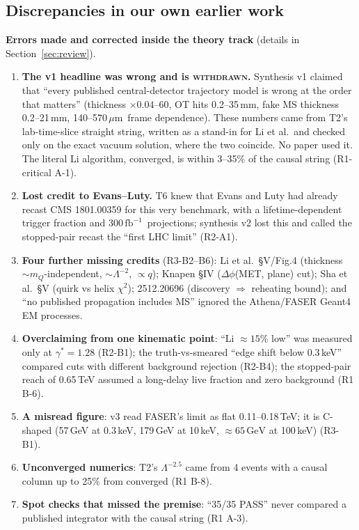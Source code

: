 \documentclass[11pt,a4paper]{article}
\newcommand{\WD}{\textcolor{bad}{\textsc{withdrawn}}}
\newcommand{\mQ}{m_Q}
\newcommand{\GeV}{\ensuremath{\,\mathrm{GeV}}}
\newcommand{\fbinv}{\ensuremath{\,\mathrm{fb}^{-1}}}
\newcommand{\um}{\ensuremath{\,\mu\mathrm{m}}}
\newcommand{\gst}{\gamma^*}
\begin{document}
\subsection{Discrepancies in our own earlier work}\label{sec:owndisc}
\begin{caution}
\textbf{Errors made and corrected inside the theory track} (details in Section~\ref{sec:review}).
\begin{enumerate}[leftmargin=1.3em]
\item \textbf{The v1 headline was wrong and is \WD{}.} Synthesis v1 claimed that ``every published central-detector trajectory model is wrong at the order that matters'' (thickness $\times0.04$--60, OT hits 0.2--35\,mm, fake MS thickness 0.2--21\,mm, 140--570\um\ frame dependence). These numbers came from T2's lab-time-slice straight string, written as a stand-in for Li et al.\ and checked only on the exact vacuum solution, where the two coincide. No paper used it. The literal Li algorithm, converged, is within 3--35\% of the causal string (R1-critical A-1).
\item \textbf{Lost credit to Evans--Luty.} T6 knew that Evans and Luty had already recast CMS 1801.00359 for this very benchmark, with a lifetime-dependent trigger fraction and 300\fbinv\ projections; synthesis v2 lost this and called the stopped-pair recast the ``first LHC limit'' (R2-A1).
\item \textbf{Four further missing credits} (R3-B2--B6): Li et al.\ \S V/Fig.4 (thickness $\sim\mQ$-independent, $\sim\Lambda^{-2}$, $\propto q$); Knapen \S IV ($\Delta\phi$(MET, plane) cut); Sha et al.\ \S V (quirk vs helix $\chi^2$); 2512.20696 (discovery $\Rightarrow$ reheating bound); and ``no published propagation includes MS'' ignored the Athena/FASER Geant4 EM processes.
\item \textbf{Overclaiming from one kinematic point}: ``Li $\approx15\%$ low'' was measured only at $\gst=1.28$ (R2-B1); the truth-vs-smeared ``edge shift below 0.3\,keV'' compared cuts with different background rejection (R2-B4); the stopped-pair reach of 0.65\,TeV assumed a long-delay live fraction and zero background (R1 B-6).
\item \textbf{A misread figure}: v3 read FASER's limit as flat 0.11--0.18\,TeV; it is C-shaped (57\,GeV at 0.3\,keV, 179\,GeV at 10\,keV, $\approx65\GeV$ at 100\,keV) (R3-B1).
\item \textbf{Unconverged numerics}: T2's $\Lambda^{-2.5}$ came from 4 events with a causal column up to 25\% from converged (R1 B-8).
\item \textbf{Spot checks that missed the premise}: ``35/35 PASS'' never compared a published integrator with the causal string (R1 A-3).

\end{enumerate}
\end{caution}
\end{document}

